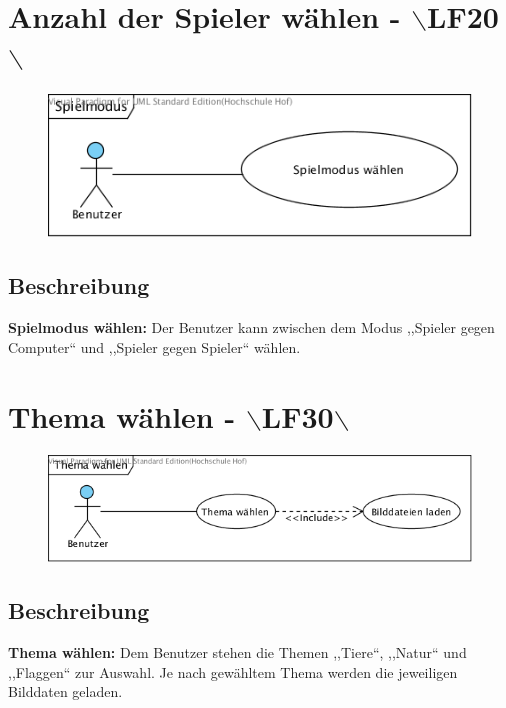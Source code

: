 \clearpage
\section{Anzahl der Spieler wählen - $\backslash$LF20$\backslash$}
\begin{figure}[!h]
	\centering
    \includegraphics[width=\textwidth]{./AnzahlSpieler.png}
	\label{layout_gesamt}
\end{figure}

\subsection{Beschreibung}
\textbf{Spielmodus wählen: }Der Benutzer kann zwischen dem Modus ,,Spieler gegen Computer`` und ,,Spieler gegen Spieler`` wählen.


\vspace{2.5 cm}
\section{Thema wählen - $\backslash$LF30$\backslash$}
\begin{figure}[!h]
	\centering
    \includegraphics[width=\textwidth]{./Thema.png}
    
	\label{layout_gesamt}
\end{figure}

\subsection{Beschreibung}
\textbf{Thema wählen: }Dem Benutzer stehen die Themen ,,Tiere``, ,,Natur`` und ,,Flaggen`` zur Auswahl. Je nach gewähltem Thema werden die jeweiligen Bilddaten geladen.

